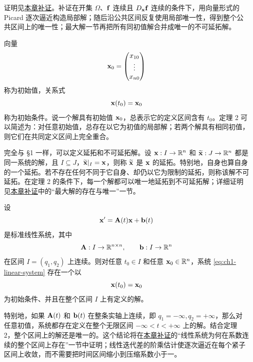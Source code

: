 证明见\hyperref[sec:existence-proofs]{本章补证}。补证在开集 \(\Omega\)、\(\vect{f}\) 连续且 \(D_{\vect{x}}\vect{f}\) 连续的条件下，用向量形式的 Picard 逐次逼近构造局部解；随后沿公共区间反复使用局部唯一性，得到整个公共区间上的唯一性；最大解一节再把所有同初值解合并成唯一的不可延拓解。

向量
\[
 \vect{x}_0=
 \begin{pmatrix}
  x_{10}\\
  \vdots\\
  x_{n0}
 \end{pmatrix}
\]
称为初始值，关系式
\begin{equation}
 \vect{x}(t_0)=\vect{x}_0
 \label{eq:ch1-initial-condition}
\end{equation}
称为初始条件。说一个解具有初始值 \(\vect{x}_0\)，总表示它的定义区间含有 \(t_0\)。定理 2 可以简述为：对任意初始值，总存在以它为初值的局部解；若两个解具有相同初值，则它们在共同定义区间上完全重合。

完全与 §1 一样，可以定义延拓和不可延拓解。设 \(\vect{x}:I\to\R^n\) 和 \(\vect{\widetilde{x}}:J\to\R^n\) 都是同一系统的解，且 \(I\subseteq J\)，\(\vect{\widetilde{x}}|_I=\vect{x}\)，则称 \(\vect{\widetilde{x}}\) 是 \(\vect{x}\) 的延拓。特别地，自身也算自身的一个延拓。若不存在任何不同于它自身、却仍以它为限制的延拓，则称该解不可延拓。在定理 2 的条件下，每一个解都可以唯一地延拓到不可延拓解；详细证明见\hyperref[sec:existence-proofs]{本章补证}中的“最大解的存在与唯一”一节。

\begin{theorem}[线性系统的整体存在性]
 \label{thm:ch1-linear-existence}
 设
 \begin{equation}
  \vect{x}'=\mat{A}(t)\vect{x}+\vect{b}(t)
  \label{eq:ch1-linear-system}
 \end{equation}
 是标准线性系统，其中
 \[
  \mat{A}:I\to\R^{n\times n},
  \qquad
  \vect{b}:I\to\R^n
 \]
 在区间 \(I=(q_1,q_2)\) 上连续。则对任意 \(t_0\in I\) 和任意 \(\vect{x}_0\in\R^n\)，系统 \eqref{eq:ch1-linear-system} 存在一个以
 \[
  \vect{x}(t_0)=\vect{x}_0
 \]
 为初始条件、并且在整个区间 \(I\) 上有定义的解。
 \end{theorem}

特别地，如果 \(\mathbf{A}(t)\) 和 \(\vect{b}(t)\) 在整条实轴上连续，即 \(q_1=-\infty,q_2=+\infty\)，那么对任意初值，系统都存在定义在整个无限区间 \(-\infty<t<+\infty\) 上的解。结合定理 2，整个区间上的解还是唯一的。这个结论将在\hyperref[sec:existence-proofs]{本章补证}的“线性系统为何在系数连续的整个区间上存在”一节中证明；线性迭代差的阶乘估计使逐次逼近在每个紧子区间上收敛，而不需要把时间区间缩小到压缩系数小于一。

